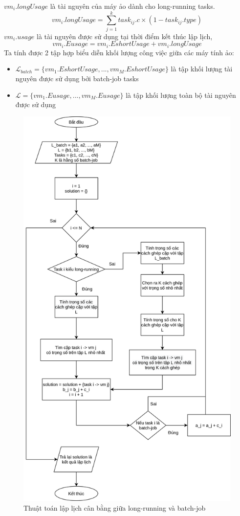 \documentclass{my_style}
\begin{document}
\noindent
$vm_{i}.longUsage$ là tài nguyên của máy ảo dành cho long-running tasks.
\[
	vm_{i}.longUsage = \sum_{j = 1}^{k}task_{ij}.c \times (1 - task_{ij}.type)
\]
$vm_{i}.usage$ là tài nguyên được sử dụng tại thời điểm kết thúc lập lịch, 
\[
	vm_{i}.Eusage = vm_{i}.EshortUsage + vm_{i}.longUsage
\]
Ta tính được 2 tập hợp biểu diễn khối lượng công việc giữa các máy tính ảo: 
\begin{itemize}
	\item $\mathcal{L}_{batch} = \{vm_{1}.EshortUsage, ..., vm_{M}.EshortUsage\}$ là tập khối lượng tài nguyên được sử dụng bởi batch-job tasks 
	\item $\mathcal{L} = \{vm_{1}.Eusage, ..., vm_{M}.Eusage\}$ là tập khối lượng toàn bộ tài nguyên được sử dụng
\end{itemize}
\begin{figure}[h!]
	\centering
	\includegraphics[scale=0.7]{images/load_balancing_proposal.png}
	\caption{Thuật toán lập lịch cân bằng giữa long-running và batch-job}
	\label{fig:algo3}
\end{figure}
\end{document}
